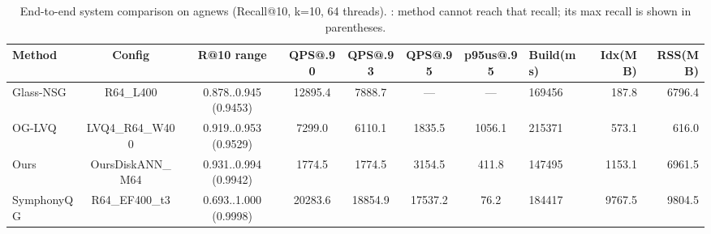 \begin{table}[t]
\centering
\small
\caption{End-to-end system comparison on agnews (Recall@10, k=10, 64 threads). \textemdash{}: method cannot reach that recall; its max recall is shown in parentheses.}
\label{tab:system_fair}
\begin{tabular}{lcccccclrr}
\toprule
Method & Config & R@10 range & QPS@.90 & QPS@.93 & QPS@.95 & p95us@.95 & Build(ms) & Idx(MB) & RSS(MB) \\
\midrule
Glass-NSG & R64_L400 & 0.878..0.945 (0.9453) & 12895.4 & 7888.7 & — & — & 169456 & 187.8 & 6796.4 \\
OG-LVQ & LVQ4_R64_W400 & 0.919..0.953 (0.9529) & 7299.0 & 6110.1 & 1835.5 & 1056.1 & 215371 & 573.1 & 616.0 \\
Ours & OursDiskANN_M64 & 0.931..0.994 (0.9942) & 1774.5 & 1774.5 & 3154.5 & 411.8 & 147495 & 1153.1 & 6961.5 \\
SymphonyQG & R64_EF400_t3 & 0.693..1.000 (0.9998) & 20283.6 & 18854.9 & 17537.2 & 76.2 & 184417 & 9767.5 & 9804.5 \\
\bottomrule
\end{tabular}
\end{table}

